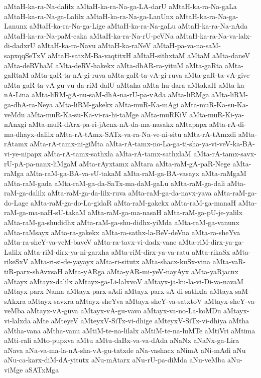 {aMtaH-ka-ra-Na-dalilx
aMtaH-ka-ra-Na-ga-LA-darU
aMtaH-ka-ra-Na-gaLa
aMtaH-ka-ra-Na-ga-Lalilx
aMtaH-ka-ra-Na-ga-LanUnx
aMtaH-ka-ra-Na-ga-Lanunx
aMtaH-ka-ra-Na-ga-Lige
aMtaH-ka-ra-Na-gaLu
aMtaH-ka-ra-Na-nAda
aMtaH-ka-ra-Na-paM-caka
aMtaH-ka-ra-Na-rU-peVNa
aMtaH-ka-ra-Na-va-lalx-di-dadxrU
aMtaH-ka-ra-Navu
aMtaH-ka-raNeV
aMtaH-pa-va-na-saM-sapxqqSeTxV
aMtaH-satxM-Ba-vaqtitxH
aMtaH-sithxtaM
aMtaM
aMta-daneV
aMta-deRVhaM
aMta-deRV-hakekx
aMta-dhAR-ra-yituM
aMta-gaRta
aMta-gaRtaM
aMta-gaR-ta-nA-gi-ruva
aMta-gaR-ta-vA-gi-ruva
aMta-gaR-ta-vA-give
aMta-gaR-ta-vA-gu-vu-da-riM-dalU
aMtaha
aMta-hu-dara
aMtakaH
aMta-ka-nA-Lina
aMta-liRM-gA-nu-saM-dhA-na-rU-pa-vAda
aMta-liRMga
aMta-liRM-ga-dhA-ra-Neya
aMta-liRM-gakekx
aMta-muR-Ka-mAgi
aMta-muR-Ka-su-Ka-veMdu
aMta-muR-Ka-su-Ka-vi-ra-hi-taMge
aMta-muRKiV
aMta-muR-Ki-ya-nAnxgi
aMta-muR-dArx-pa-ri-jAcnx-nA-da-ma-nasakx
aMtapapx
aMta-rA-di-ma-dhayx-dalilx
aMta-rA-tAmx-SATx-va-ra-Na-ve-ni-situ
aMta-rA-tAmxdi
aMta-rAtamx
aMta-rA-tamx-ni-giMta
aMta-rA-tamx-no-La-ga-ti-sha-ya-vi-veV-ka-BA-vi-ye-nipapx
aMta-rA-tamx-sathxla
aMta-rA-tamx-sathxlaM
aMta-rA-tamx-savx-rU-pA-pa-nanx-liMgaM
aMta-rAyxtamx
aMtara
aMta-raM-gA-paR-Nege
aMta-raMga
aMta-raM-ga-BA-va-sU-takaM
aMta-raM-ga-BA-vasayx
aMta-raMgaM
aMta-raM-gada
aMta-raM-ga-da-SaTx-ma-daM-gaLu
aMta-raM-ga-dali
aMta-raM-ga-dalilx
aMta-raM-ga-da-lilx-ruva
aMta-raM-ga-da-navx-yava
aMta-raM-ga-do-Lage
aMta-raM-ga-do-La-gidaR
aMta-raM-gakekx
aMta-raM-ga-manaH
aMta-raM-ga-ma-naH-sU-takaM
aMta-raM-ga-ma-nasaH
aMta-raM-ga-pU-je-yalilx
aMta-raM-ga-shudidhx
aMta-raM-ga-shu-didhx-yiMda
aMta-raM-ga-vanunx
aMta-raMsayx
aMta-ra-gakekx
aMta-ra-sathx-la-BeV-deVna
aMta-ra-sheYva
aMta-ra-sheY-va-veM-baveV
aMta-ra-tavx-vi-dadx-vane
aMta-riM-dirx-ya-ga-Lalilx
aMta-riM-dirx-ya-ni-garxha
aMta-riM-dirx-ya-va-ratu
aMta-rikaSx
aMta-rikeSxV
aMta-ri-si-de-yayayx
aMta-ri-situtx
aMta-shacx-kuSx-vina
aMta-vaR-tiR-parx-shAvxsaH
aMta-yARga
aMta-yAR-mi-yeV-nayAyx
aMta-yaRjacnx
aMtayx
aMtayx-dalilx
aMtayx-ga-Li-lalxvoV
aMtayx-ja-ku-la-vi-Di-va-navaM
aMtayx-parx-Nama
aMtayx-parx-sAdi
aMtayx-parx-sA-di-sathxla
aMtayx-saM-sAkxra
aMtayx-savxra
aMtayx-sheYva
aMtayx-sheY-va-satxtoV
aMtayx-sheY-va-veMba
aMtayx-vA-guva
aMtayx-vA-gu-vavo
aMtayx-va-no-La-koMDu
aMtayx-vi-lalxda
aMte
aMteyeV
aMteyxV-SiTx-vi-dhige
aMteyxV-SiTx-vi-dhiya
aMtha
aMtha-vana
aMtha-vanu
aMtiM-te-na-lilalx
aMtiM-te-na-luMTe
aMtiVri
aMtima
aMti-rali
aMto-pupxva
aMtu
aMtu-daBx-va-va-dAda
aNaNx
aNaNx-ga-Lira
aNava
aNa-va-ma-la-nA-sha-vA-gu-tatxde
aNa-vashacx
aNimA
aNi-mAdi
aNu
aNu-ca-karx-diM-dA-yitutx
aNu-mAtarx
aNu-rU-pa-diMda
aNu-veMba
aNu-viMge
aSATxMga
}
